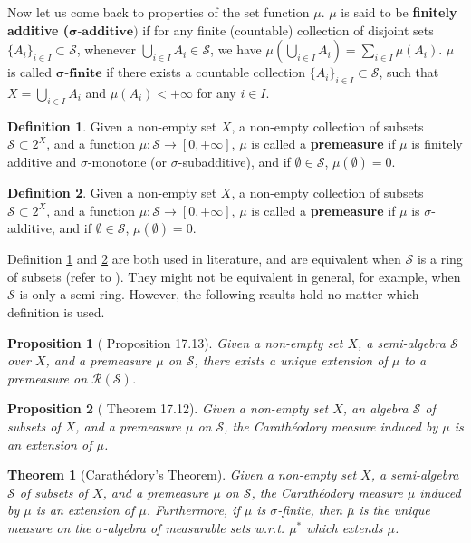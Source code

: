 \documentclass[openany]{book}
\newtheorem{proposition}{Proposition}[chapter]
\newtheorem{theorem}{Theorem}[chapter]
\theoremstyle{definition}
\newtheorem{definition}{Definition}[chapter]
\theoremstyle{remark}
\begin{document}
Now let us come back to properties of the set function $\mu$. $\mu$ is said to be \textbf{finitely additive (}$\boldsymbol{\sigma}\textbf{-additive)}$ if for any finite (countable) collection of disjoint sets $\{A_i\}_{i\in I}\subset \mathcal{S}$, whenever $\bigcup_{i\in I}A_i\in \mathcal{S}$, we have $\mu\left(\bigcup_{i\in I}A_i\right)=\sum_{i\in I}^{}\mu(A_i)$. $\mu$ is called $\boldsymbol{\sigma}\textbf{-finite}$ if there exists a countable collection $\{A_i\}_{i\in I}\subset \mathcal{S}$, such that $X=\bigcup_{i\in I}A_i$ and $\mu(A_i)<+\infty$ for any $i\in I$.
\begin{definition}\label{def:preMeasure1}
    Given a non-empty set $X$, a non-empty collection of subsets $\mathcal{S}\subset2^X$, and a function $\mu:\mathcal{S}\to[0,+\infty]$, $\mu$ is called a \textbf{premeasure} if $\mu$ is finitely additive and $\sigma$-monotone (or $\sigma$-subadditive), and if $\emptyset\in \mathcal{S}$, $\mu(\emptyset)=0$.
\end{definition}
\begin{definition}\label{def:preMeasure2}
    Given a non-empty set $X$, a non-empty collection of subsets $\mathcal{S}\subset2^X$, and a function $\mu:\mathcal{S}\to[0,+\infty]$, $\mu$ is called a \textbf{premeasure} if $\mu$ is $\sigma$-additive, and if $\emptyset\in \mathcal{S}$, $\mu(\emptyset)=0$.
\end{definition}
Definition \ref{def:preMeasure1} and \ref{def:preMeasure2} are both used in literature, and are equivalent when $\mathcal{S}$ is a ring of subsets (refer to \cite{SS09}). They might not be equivalent in general, for example, when $\mathcal{S}$ is only a semi-ring. However, the following results hold no matter which definition is used.
\begin{proposition}[\cite{RF88} Proposition 17.13]
    Given a non-empty set $X$, a semi-algebra $\mathcal{S}$ over $X$, and a premeasure $\mu$ on $\mathcal{S}$, there exists a unique extension of $\mu$ to a premeasure on $\mathcal{R}(\mathcal{S})$.
\end{proposition}
\begin{proposition}[\cite{RF88} Theorem 17.12]
    Given a non-empty set $X$, an algebra $\mathcal{S}$ of subsets of $X$, and a premeasure $\mu$ on $\mathcal{S}$, the Carath\'{e}odory measure induced by $\mu$ is an extension of $\mu$.
\end{proposition}
\begin{theorem}[Carath\'{e}dory's Theorem]\label{thm:CarathHahn}
    Given a non-empty set $X$, a semi-algebra $\mathcal{S}$ of subsets of $X$, and a premeasure $\mu$ on $\mathcal{S}$, the Carath\'{e}odory measure $\bar{\mu}$ induced by $\mu$ is an extension of $\mu$. Furthermore, if $\mu$ is $\sigma$-finite, then $\bar{\mu}$ is the unique measure on the $\sigma$-algebra of measurable sets w.r.t. $\mu^*$ which extends $\mu$.
\end{theorem}
\end{document}
